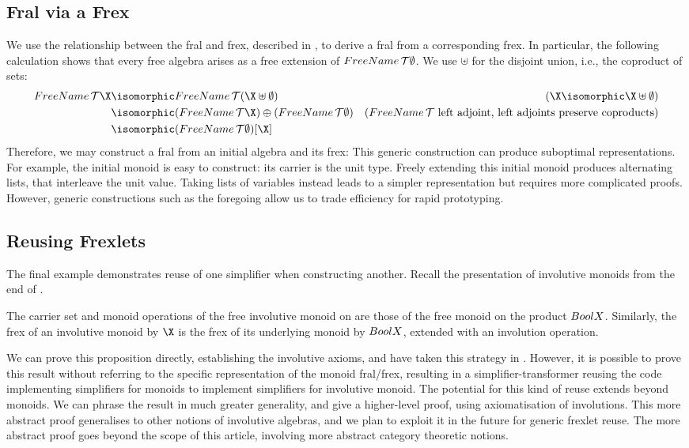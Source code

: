 \subsection{Fral via a Frex}
We use the relationship between the fral and frex, described in , to derive a fral from a corresponding frex.
%
In particular, the following calculation shows that every free algebra arises as a free extension of $\FreeName\,\Pres\emptyset$. We use $\uplus$ for the disjoint union, i.e., the coproduct of sets:
\begin{align*}
\FreeName\,\Pres\X
&\isomorphic \FreeName\,\Pres(\X\uplus\emptyset) & (\X \isomorphic \X \uplus \emptyset)\\
&\isomorphic (\FreeName\,\Pres\X)\oplus(\FreeName\,\Pres\emptyset) & (\text{$\FreeName\,\Pres$ left adjoint, left adjoints preserve coproducts})\\
&\isomorphic (\FreeName\,\Pres\emptyset){}[\X]
\end{align*}
%
Therefore, we may construct a fral from an initial
algebra and its frex:
This generic construction can produce suboptimal
representations.  For example, the initial monoid is easy to
construct: its carrier is the unit type. Freely extending this
initial monoid produces alternating lists, that interleave the unit
value. Taking lists of variables instead leads to a simpler representation but
requires more complicated proofs.  However, generic constructions such as the foregoing allow us to trade efficiency for rapid prototyping.

\subsection{Reusing Frexlets}
The final example demonstrates reuse of one simplifier when
constructing another. Recall the presentation of involutive monoids
from the end of .
\begin{proposition}[Jacobs]\label{prop:involution}
  The carrier set and monoid operations of the free involutive monoid on \X{}
  are those of the free monoid on the product\/ $\BoolX$.
  Similarly, the frex of an involutive monoid by $\X$ is the
  frex of its underlying monoid by\/ $\BoolX$, extended with an involution operation.
\end{proposition}
We can prove this proposition directly, establishing the involutive
axioms, and have taken this strategy in \Frexlib{}.  However, it is
possible to prove this result without referring to the specific
representation of the monoid fral/frex, resulting in a
simplifier-transformer reusing the code implementing simplifiers for
monoids to implement simplifiers for involutive monoid.  The potential
for this kind of reuse extends beyond monoids.  We can phrase the
result in much greater generality, and give a higher-level proof,
using  axiomatisation of involutions. This
more abstract proof generalises to other notions of involutive
algebras, and we plan to exploit it in the future for generic frexlet
reuse. The more abstract proof goes beyond the scope of this
article, involving more abstract category theoretic notions.
